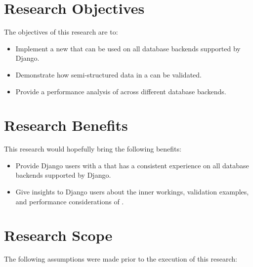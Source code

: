 \section{Research Objectives}

The objectives of this research are to:

\begin{itemize}
    \item Implement a new  that can be used on all database
          backends supported by Django.
    \item Demonstrate how semi-structured data in a  can be
    validated.
    \item Provide a performance analysis of  across different
          database backends.
\end{itemize}

\section{Research Benefits}

This research would hopefully bring the following benefits:

\begin{itemize}
    \item Provide Django users with a  that has a consistent
          experience on all database backends supported by Django.
    \item Give insights to Django users about the inner workings, validation
          examples, and performance considerations of .
\end{itemize}

\section{Research Scope}

The following assumptions were made prior to the execution of this research:

